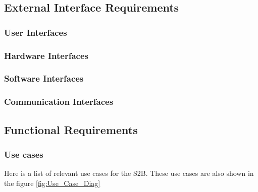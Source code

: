\subsection{External Interface Requirements}
\subsubsection{User Interfaces}
\subsubsection{Hardware Interfaces}
\subsubsection{Software Interfaces}
\subsubsection{Communication Interfaces}
\subsection{Functional Requirements}
\subsubsection{Use cases}
Here is a list of relevant use cases for the S2B. These use cases are also shown in the figure \ref{fig:Use_Case_Diag} 
\smallskip

